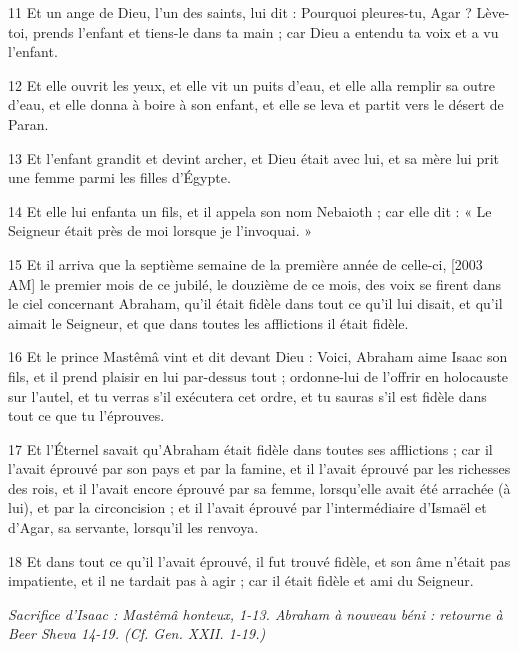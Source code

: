 \par 11 Et un ange de Dieu, l'un des saints, lui dit : Pourquoi pleures-tu, Agar ? Lève-toi, prends l’enfant et tiens-le dans ta main ; car Dieu a entendu ta voix et a vu l'enfant.
\par 12 Et elle ouvrit les yeux, et elle vit un puits d'eau, et elle alla remplir sa outre d'eau, et elle donna à boire à son enfant, et elle se leva et partit vers le désert de Paran.
\par 13 Et l'enfant grandit et devint archer, et Dieu était avec lui, et sa mère lui prit une femme parmi les filles d'Égypte.
\par 14 Et elle lui enfanta un fils, et il appela son nom Nebaioth ; car elle dit : « Le Seigneur était près de moi lorsque je l'invoquai. »
\par 15 Et il arriva que la septième semaine de la première année de celle-ci, [2003 AM] le premier mois de ce jubilé, le douzième de ce mois, des voix se firent dans le ciel concernant Abraham, qu'il était fidèle dans tout ce qu'il lui disait, et qu'il aimait le Seigneur, et que dans toutes les afflictions il était fidèle.
\par 16 Et le prince Mastêmâ vint et dit devant Dieu : Voici, Abraham aime Isaac son fils, et il prend plaisir en lui par-dessus tout ; ordonne-lui de l'offrir en holocauste sur l'autel, et tu verras s'il exécutera cet ordre, et tu sauras s'il est fidèle dans tout ce que tu l'éprouves.
\par 17 Et l'Éternel savait qu'Abraham était fidèle dans toutes ses afflictions ; car il l'avait éprouvé par son pays et par la famine, et il l'avait éprouvé par les richesses des rois, et il l'avait encore éprouvé par sa femme, lorsqu'elle avait été arrachée (à lui), et par la circoncision ; et il l'avait éprouvé par l'intermédiaire d'Ismaël et d'Agar, sa servante, lorsqu'il les renvoya.
\par 18 Et dans tout ce qu'il l'avait éprouvé, il fut trouvé fidèle, et son âme n'était pas impatiente, et il ne tardait pas à agir ; car il était fidèle et ami du Seigneur.


\par \textit{Sacrifice d'Isaac : Mastêmâ honteux, 1-13. Abraham à nouveau béni : retourne à Beer Sheva 14-19. (Cf. Gen. XXII. 1-19.)}

